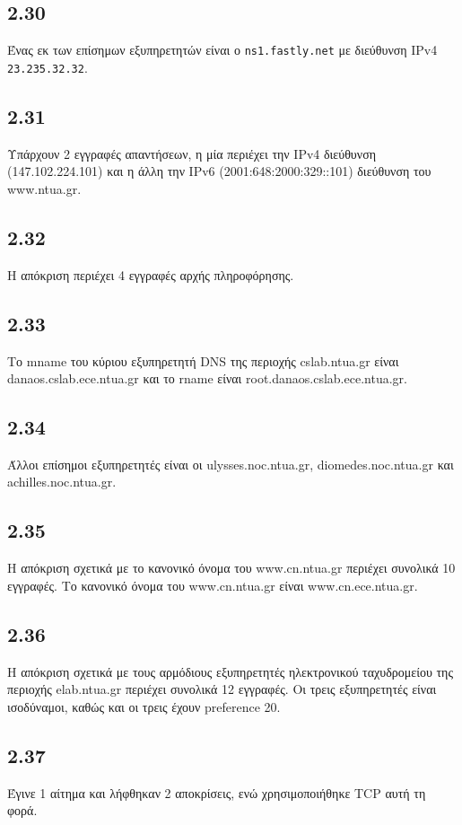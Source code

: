 		\subsection*{2.30} 
			Ένας εκ των επίσημων εξυπηρετητών είναι ο \verb|ns1.fastly.net| με διεύθυνση IPv4 \verb|23.235.32.32|.

		\subsection*{2.31} 
			Υπάρχουν 2 εγγραφές απαντήσεων, η μία περιέχει την IPv4 διεύθυνση (147.102.224.101) και η άλλη την IPv6 (2001:648:2000:329::101) διεύθυνση του www.ntua.gr. 

		\subsection*{2.32} 
			Η απόκριση περιέχει 4 εγγραφές αρχής πληροφόρησης.

		\subsection*{2.33} 
			Το mname του κύριου εξυπηρετητή DNS της περιοχής cslab.ntua.gr είναι danaos.cslab.ece.ntua.gr και το rname είναι root.danaos.cslab.ece.ntua.gr.

		\subsection*{2.34} 
			Άλλοι επίσημοι εξυπηρετητές είναι οι ulysses.noc.ntua.gr, diomedes.noc.ntua.gr και achilles.noc.ntua.gr.

		\subsection*{2.35} 
			Η απόκριση σχετικά με το κανονικό όνομα του www.cn.ntua.gr περιέχει συνολικά 10 εγγραφές. Το κανονικό όνομα του www.cn.ntua.gr είναι www.cn.ece.ntua.gr.

		\subsection*{2.36} 
			Η απόκριση σχετικά με τους αρμόδιους εξυπηρετητές ηλεκτρονικού ταχυδρομείου της περιοχής elab.ntua.gr περιέχει συνολικά 12 εγγραφές. Οι τρεις εξυπηρετητές είναι ισοδύναμοι, καθώς και οι τρεις έχουν preference 20.

		\subsection*{2.37} 
			Έγινε 1 αίτημα και λήφθηκαν 2 αποκρίσεις, ενώ χρησιμοποιήθηκε TCP αυτή τη φορά.

